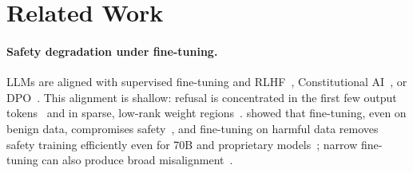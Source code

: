 \section{Related Work}
\label{sec:related_works}

\paragraph{Safety degradation under fine-tuning.}
LLMs are aligned with supervised fine-tuning and RLHF~\citep{christiano2017deep, stiennon2020summarization, ouyang2022training, bai2022training}, Constitutional AI~\citep{bai2022constitutional}, or DPO~\citep{rafailov2023dpo}. This alignment is shallow: refusal is concentrated in the first few output tokens~\citep{qi2025safety} and in sparse, low-rank weight regions~\citep{wei2024assessing}. \citet{qi2024finetuning} showed that fine-tuning, even on benign data, compromises safety~\citep[see also][]{fraser2025finetuninglowers}, and fine-tuning on harmful data removes safety training efficiently even for 70B and proprietary models~\citep{lermen2023lora, zhan2024removing}; narrow fine-tuning can also produce broad misalignment~\citep{betley2025emergent}.

